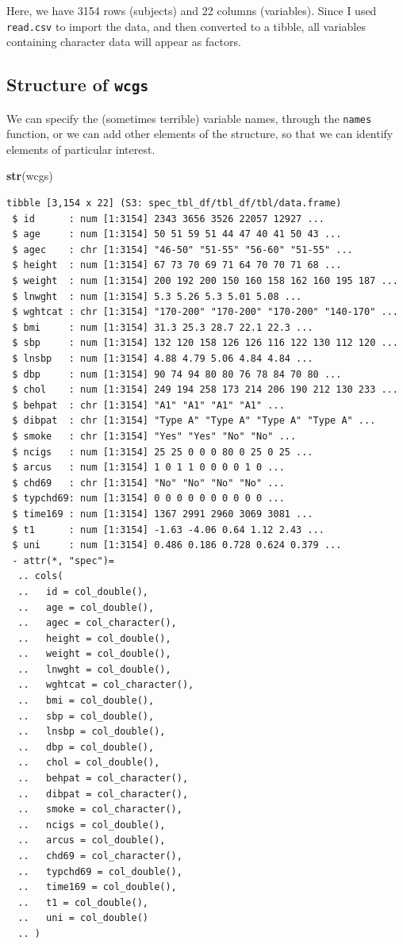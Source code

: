 \documentclass[
]{book}
\newenvironment{Shaded}{\begin{snugshade}}{\end{snugshade}}
\newcommand{\KeywordTok}[1]{\textcolor[rgb]{0.13,0.29,0.53}{\textbf{#1}}}
\newcommand{\NormalTok}[1]{#1}
\begin{document}
Here, we have 3154 rows (subjects) and 22 columns (variables). Since I used \texttt{read.csv} to import the data, and then converted to a tibble, all variables containing character data will appear as factors.

\hypertarget{structure-of-wcgs}{%
\subsection{\texorpdfstring{Structure of \texttt{wcgs}}{Structure of wcgs}}\label{structure-of-wcgs}}

We can specify the (sometimes terrible) variable names, through the \texttt{names} function, or we can add other elements of the structure, so that we can identify elements of particular interest.

\begin{Shaded}
\begin{Highlighting}[]
\KeywordTok{str}\NormalTok{(wcgs)}
\end{Highlighting}
\end{Shaded}

\begin{verbatim}
tibble [3,154 x 22] (S3: spec_tbl_df/tbl_df/tbl/data.frame)
 $ id      : num [1:3154] 2343 3656 3526 22057 12927 ...
 $ age     : num [1:3154] 50 51 59 51 44 47 40 41 50 43 ...
 $ agec    : chr [1:3154] "46-50" "51-55" "56-60" "51-55" ...
 $ height  : num [1:3154] 67 73 70 69 71 64 70 70 71 68 ...
 $ weight  : num [1:3154] 200 192 200 150 160 158 162 160 195 187 ...
 $ lnwght  : num [1:3154] 5.3 5.26 5.3 5.01 5.08 ...
 $ wghtcat : chr [1:3154] "170-200" "170-200" "170-200" "140-170" ...
 $ bmi     : num [1:3154] 31.3 25.3 28.7 22.1 22.3 ...
 $ sbp     : num [1:3154] 132 120 158 126 126 116 122 130 112 120 ...
 $ lnsbp   : num [1:3154] 4.88 4.79 5.06 4.84 4.84 ...
 $ dbp     : num [1:3154] 90 74 94 80 80 76 78 84 70 80 ...
 $ chol    : num [1:3154] 249 194 258 173 214 206 190 212 130 233 ...
 $ behpat  : chr [1:3154] "A1" "A1" "A1" "A1" ...
 $ dibpat  : chr [1:3154] "Type A" "Type A" "Type A" "Type A" ...
 $ smoke   : chr [1:3154] "Yes" "Yes" "No" "No" ...
 $ ncigs   : num [1:3154] 25 25 0 0 0 80 0 25 0 25 ...
 $ arcus   : num [1:3154] 1 0 1 1 0 0 0 0 1 0 ...
 $ chd69   : chr [1:3154] "No" "No" "No" "No" ...
 $ typchd69: num [1:3154] 0 0 0 0 0 0 0 0 0 0 ...
 $ time169 : num [1:3154] 1367 2991 2960 3069 3081 ...
 $ t1      : num [1:3154] -1.63 -4.06 0.64 1.12 2.43 ...
 $ uni     : num [1:3154] 0.486 0.186 0.728 0.624 0.379 ...
 - attr(*, "spec")=
  .. cols(
  ..   id = col_double(),
  ..   age = col_double(),
  ..   agec = col_character(),
  ..   height = col_double(),
  ..   weight = col_double(),
  ..   lnwght = col_double(),
  ..   wghtcat = col_character(),
  ..   bmi = col_double(),
  ..   sbp = col_double(),
  ..   lnsbp = col_double(),
  ..   dbp = col_double(),
  ..   chol = col_double(),
  ..   behpat = col_character(),
  ..   dibpat = col_character(),
  ..   smoke = col_character(),
  ..   ncigs = col_double(),
  ..   arcus = col_double(),
  ..   chd69 = col_character(),
  ..   typchd69 = col_double(),
  ..   time169 = col_double(),
  ..   t1 = col_double(),
  ..   uni = col_double()
  .. )
\end{verbatim}
\end{document}
